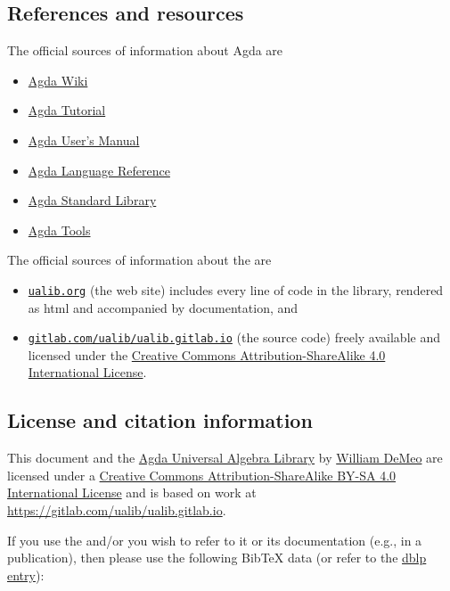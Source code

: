 \subsection*{References and resources}

The official sources of information about Agda are
\begin{itemize}
\item \href{https://wiki.portal.chalmers.se/agda/pmwiki.php}{Agda Wiki}
\item \href{https://people.inf.elte.hu/pgj/agda/tutorial/Index.html}{Agda Tutorial}
\item \href{https://agda.readthedocs.io/en/v2.6.1/}{Agda User's Manual}
\item \href{https://agda.readthedocs.io/en/v2.6.1/language}{Agda Language Reference}
\item \href{https://agda.github.io/agda-stdlib/}{Agda Standard Library}
\item \href{https://agda.readthedocs.io/en/v2.6.1/tools/}{Agda Tools}
\end{itemize}


\noindent The official sources of information about the \agdaualib are
\begin{itemize}
  \item \href{https://ualib.gitlab.io}{\texttt{ualib.org}} (the web site) includes every line of code in the library, rendered as html and accompanied by documentation, and
  \item \href{https://gitlab.com/ualib/ualib.gitlab.io}{\texttt{gitlab.com/ualib/ualib.gitlab.io}} (the source code) freely available and licensed under the \href{https://creativecommons.org/licenses/by-sa/4.0/}{Creative Commons Attribution-ShareAlike 4.0 International License}.
\end{itemize}


\subsection*{License and citation information}
This document and the \href{https://gitlab.com/ualib/ualib.gitlab.io/}{Agda Universal Algebra Library} by \href{mailto:williamdemeo@gmail.com}{William DeMeo} are licensed under a \href{http://creativecommons.org/licenses/by-sa/4.0/}{Creative Commons Attribution-ShareAlike BY-SA 4.0 International License} and is based on work at \url{https://gitlab.com/ualib/ualib.gitlab.io}.

If you use the \agdaualib and/or you wish to refer to it or its documentation (e.g., in a publication), then please use the following BibTeX data (or refer to the \href{https://dblp.uni-trier.de/rec/journals/corr/abs-2101-10166.html?view=bibtex}{dblp entry}):

